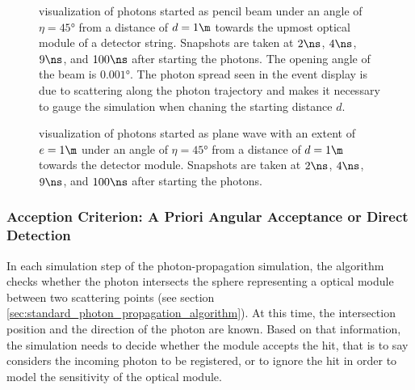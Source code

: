 \begin{figure}[htbp]
  \hfill
  \hfill
  \hfill
  \caption{ visualization of photons started as pencil beam under an angle of $\eta = \ang{45}$ from a distance of $d = 1\m$ towards the upmost optical module of a detector string. Snapshots are taken at $2\ns$, $4\ns$, $9\ns$, and $100\ns$ after starting the photons. The opening angle of the beam is $\ang{0.001}$. The photon spread seen in the event display is due to scattering along the photon trajectory and makes it necessary to gauge the simulation when chaning the starting distance $d$.}
  \label{fig:Paihah7h}
\end{figure}

\begin{figure}[htbp]
  \hfill
  \hfill
  \hfill
  \caption{ visualization of photons started as plane wave with an extent of $e = 1\m$ under an angle of $\eta = \ang{45}$ from a distance of $d = 1\m$ towards the detector module. Snapshots are taken at $2\ns$, $4\ns$, $9\ns$, and $100\ns$ after starting the photons.}
  \label{fig:Aehi7kae}
\end{figure}


\FloatBarrier
\subsubsection{Acception Criterion: A Priori Angular Acceptance or Direct Detection}
\label{sec:acception_criterion}\label{sec:a_priori_angular_acceptance}
In each simulation step of the photon-propagation simulation, the algorithm checks whether the photon intersects the sphere representing a optical module between two scattering points (see section \ref{sec:standard_photon_propagation_algorithm}). At this time, the intersection position and the direction of the photon are known. Based on that information, the simulation needs to decide whether the module accepts the hit, that is to say considers the incoming photon to be registered, or to ignore the hit in order to model the sensitivity of the optical module.

